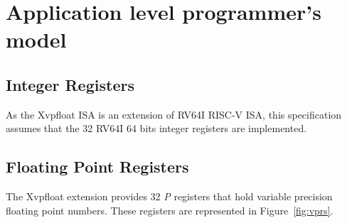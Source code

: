\chapter{Application level programmer's model}

\section{Integer Registers}

As the Xvpfloat ISA is an extension of RV64I RISC-V ISA, this specification assumes that the 32 RV64I 64 bits integer registers are implemented.

\section{Floating Point Registers}

\label{sec:vpregs}

The Xvpfloat extension provides 32 {\em P} registers that hold variable precision floating point numbers.
These registers are represented in Figure~\ref{fig:vprs}.

